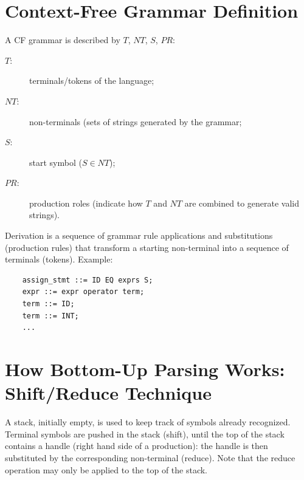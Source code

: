 \section{Context-Free Grammar Definition}
A CF grammar is described by $T$, $NT$, $S$, $PR$:
\begin{description}
	\item[$T$:] terminals/tokens of the language;
	\item[$NT$:] non-terminals (sets of strings generated by the grammar;
	\item[$S$:] start symbol ($S \in NT$);
	\item[$PR$:] production roles (indicate how $T$ and $NT$ are combined to generate valid strings).
\end{description}

Derivation is a sequence of grammar rule applications and substitutions (production rules) that transform a starting non-terminal into a sequence of terminals (tokens).
Example:
\begin{lstlisting}
	assign_stmt ::= ID EQ exprs S;
	expr ::= expr operator term;
	term ::= ID;
	term ::= INT;
	...
\end{lstlisting}

\section{How Bottom-Up Parsing Works: Shift/Reduce Technique}
A stack, initially empty, is used to keep track of symbols already recognized.
Terminal symbols are pushed in the stack (shift), until the top of the stack contains a handle (right hand side of a production): the handle is then substituted by the corresponding non-terminal (reduce).
Note that the reduce operation may only be applied to the top of the stack.

